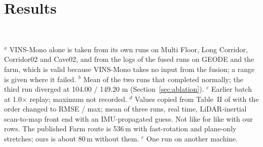 \documentclass[journal]{IEEEtran}
\begin{document}
\section{Results}
\begin{table}[t]
\caption{ATE of the front end, RMSE / max in metres; $n$ = number of live runs, mean over runs. ``--'': not available or not recorded (not a failed run); a run with ATE above 10\,m counts as failed. Bold: best of our own rows. Farm: Gazebo simulation, route about 80\,m.}
\label{tab:main}
\centering\footnotesize
{}\\[2pt]
\raggedright\scriptsize $^{a}$ VINS-Mono alone is taken from its own runs on Multi Floor, Long Corridor, Corridor02 and Cave02, and from the logs of the fused runs on GEODE and the farm, which is valid because VINS-Mono takes no input from the fusion; a range is given where it failed. $^{b}$ Mean of the two runs that completed normally; the third run diverged at 104.00 / 149.20 m (Section~\ref{sec:ablation}). $^{c}$ Earlier batch at 1.0$\times$ replay; maximum not recorded. $^{d}$ Values copied from Table~II of \cite{switchslam2024} with the order changed to RMSE / max; mean of three runs, real time, LiDAR-inertial scan-to-map front end with an IMU-propagated guess. Not like for like with our rows. The published Farm route is 536\,m with fast-rotation and plane-only stretches; ours is about 80\,m without them. $^{e}$ One run on another machine.
\end{table}
\end{document}
